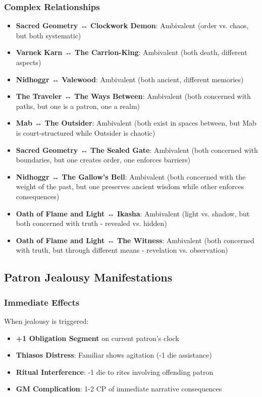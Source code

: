 \documentclass[12pt,twoside]{book}
\begin{document}
\subsubsection{Complex Relationships}
\begin{itemize}
\item \textbf{Sacred Geometry ↔ Clockwork Demon}: Ambivalent (order vs. chaos, but both systematic)
\item \textbf{Varnek Karn ↔ The Carrion-King}: Ambivalent (both death, different aspects)
\item \textbf{Nidhoggr ↔ Valewood}: Ambivalent (both ancient, different memories)
\item \textbf{The Traveler ↔ The Ways Between}: Ambivalent (both concerned with paths, but one is a patron, one a realm)
\item \textbf{Mab ↔ The Outsider}: Ambivalent (both exist in spaces between, but Mab is court-structured while Outsider is chaotic)
\item \textbf{Sacred Geometry ↔ The Sealed Gate}: Ambivalent (both concerned with boundaries, but one creates order, one enforces barriers)
\item \textbf{Nidhoggr ↔ The Gallow's Bell}: Ambivalent (both concerned with the weight of the past, but one preserves ancient wisdom while other enforces consequences)
\item \textbf{Oath of Flame and Light ↔ Ikasha}: Ambivalent (light vs. shadow, but both concerned with truth - revealed vs. hidden)
\item \textbf{Oath of Flame and Light ↔ The Witness}: Ambivalent (both concerned with truth, but through different means - revelation vs. observation)
\end{itemize}

\subsection{Patron Jealousy Manifestations}

\subsubsection{Immediate Effects}
When jealousy is triggered:
\begin{itemize}
\item \textbf{+1 Obligation Segment} on current patron's clock
\item \textbf{Thiasos Distress}: Familiar shows agitation (-1 die assistance)
\item \textbf{Ritual Interference}: -1 die to rites involving offending patron
\item \textbf{GM Complication}: 1-2 CP of immediate narrative consequences
\end{itemize}
\end{document}
